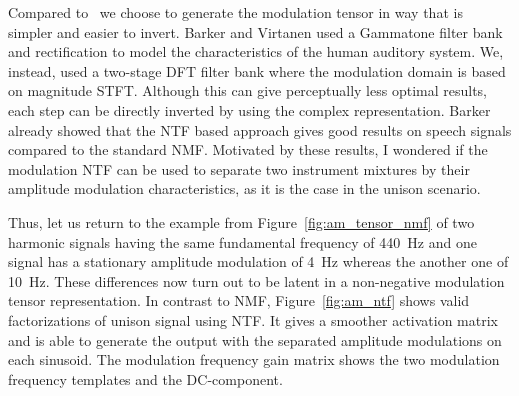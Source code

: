%
%
\par
Compared to~\cite{barker13} we choose to generate the modulation tensor in way that is simpler and easier to invert. 
Barker and Virtanen used a Gammatone filter bank and rectification to model the characteristics of the human auditory system. 
We, instead, used a two-stage DFT filter bank where the modulation domain is based on magnitude STFT. Although this can give perceptually less optimal results, each step can be directly inverted by using the complex representation.
Barker already showed that the NTF based approach gives good results on speech signals compared to the standard NMF. 
Motivated by these results, I wondered if the modulation NTF can be used to separate two instrument mixtures by their amplitude modulation characteristics, as it is the case in the unison scenario.
\par
Thus, let us return to the example from Figure~\ref{fig:am_tensor_nmf} of two harmonic signals having the same fundamental frequency of 440~\si{\hertz} and one signal has a stationary amplitude modulation of 4~\si{\hertz} whereas the another one of 10~\si{\hertz}. 
These differences now turn out to be latent in a non-negative modulation tensor representation.
In contrast to NMF, Figure~\ref{fig:am_ntf} shows valid factorizations of unison signal using NTF.
It gives a smoother activation matrix and is able to generate the output with the separated amplitude modulations on each sinusoid. The modulation frequency gain matrix shows the two modulation frequency templates and the DC-component.

